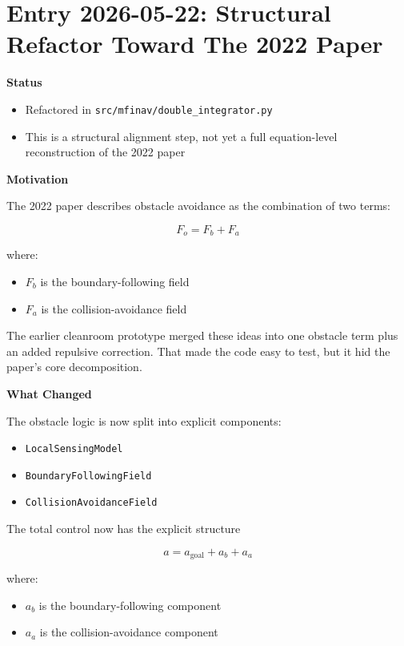 \documentclass[11pt]{article}
\begin{document}
\section*{Entry 2026-05-22: Structural Refactor Toward The 2022 Paper}

\textbf{Status}

\begin{itemize}[leftmargin=*]
  \item Refactored in \texttt{src/mfinav/double\_integrator.py}
  \item This is a structural alignment step, not yet a full equation-level reconstruction of the 2022 paper
\end{itemize}

\textbf{Motivation}

The 2022 paper describes obstacle avoidance as the combination of two terms:

\begin{equation}
F_o = F_b + F_a
\end{equation}

where:

\begin{itemize}[leftmargin=*]
  \item $F_b$ is the boundary-following field
  \item $F_a$ is the collision-avoidance field
\end{itemize}

The earlier cleanroom prototype merged these ideas into one obstacle term plus
an added repulsive correction. That made the code easy to test, but it hid the
paper's core decomposition.

\textbf{What Changed}

The obstacle logic is now split into explicit components:

\begin{itemize}[leftmargin=*]
  \item \texttt{LocalSensingModel}
  \item \texttt{BoundaryFollowingField}
  \item \texttt{CollisionAvoidanceField}
\end{itemize}

The total control now has the explicit structure

\begin{equation}
a = a_{\text{goal}} + a_b + a_a
\end{equation}

where:

\begin{itemize}[leftmargin=*]
  \item $a_b$ is the boundary-following component
  \item $a_a$ is the collision-avoidance component
\end{itemize}
\end{document}
